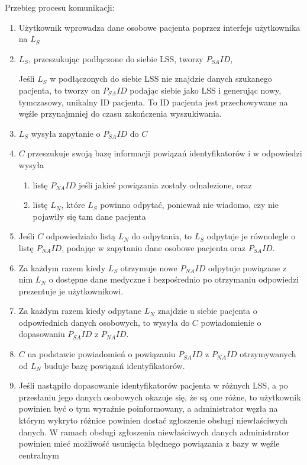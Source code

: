 \documentclass[a4paper]{report}
\begin{document}
Przebieg procesu komunikacji:
\begin{enumerate}
  \item Użytkownik wprowadza dane osobowe pacjenta poprzez interfejs użytkownika na $L_S$
  \item $L_S$, przeszukując podłączone do siebie LSS, tworzy $P_{SA}ID$,

  Jeśli $L_S$ w podłączonych do siebie LSS nie znajdzie danych szukanego pacjenta, to tworzy on $P_{SA}ID$ podając siebie jako LSS i generując nowy, tymczasowy, unikalny ID pacjenta. To ID pacjenta jest przechowywane na węźle przynajmniej do czasu zakończenia wyszukiwania.
  
  \item $L_S$ wysyła zapytanie o $P_{SA}ID$ do $C$
  \item $C$ przeszukuje swoją bazę informacji powiązań identyfikatorów i w odpowiedzi wysyła
    \begin{enumerate}
      \item listę $P_{NA}ID$ jeśli jakieś powiązania zostały odnalezione, oraz
      \item listę $L_N$, które $L_S$ powinno odpytać, ponieważ nie wiadomo, czy nie pojawiły się tam dane pacjenta
    \end{enumerate}
  \item Jeśli $C$ odpowiedziało listą $L_N$ do odpytania, to $L_S$ odpytuje je równolegle o listę $P_{NA}ID$,
  podając w zapytaniu dane osobowe pacjenta oraz $P_{SA}ID$.
  \item Za każdym razem kiedy $L_S$ otrzymuje nowe $P_{NA}ID$ odpytuje powiązane z nim $L_N$ o dostępne dane medyczne i bezpośrednio
  po otrzymaniu odpowiedzi prezentuje je użytkownikowi.
  \item Za każdym razem kiedy odpytane $L_N$ znajdzie u siebie pacjenta o odpowiednich danych osobowych, to wysyła do $C$ powiadomienie
  o dopasowaniu $P_{SA}ID$ z $P_{NA}ID$.
  \item $C$ na podstawie powiadomień o powiązaniu $P_{SA}ID$ z $P_{NA}ID$ otrzymywanych od $L_N$ buduje bazę powiązań identyfikatorów.
  \item Jeśli nastąpiło dopasowanie identyfikatorów pacjenta w różnych LSS, a po przesłaniu jego danych osobowych okazuje się, że są one różne, to użytkownik powinien być o tym wyraźnie poinformowany, a administrator węzła na którym wykryto różnice powinien dostać zgłoszenie obsługi niewłaściwych danych. W ramach obsługi zgłoszenia niewłaściwych danych administrator powinien mieć możliwość usunięcia błędnego powiązania z bazy w węźle centralnym

\end{enumerate}
\end{document}
